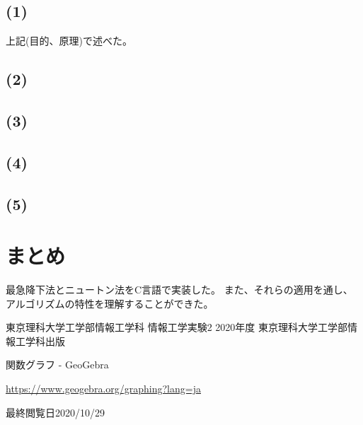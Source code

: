 \documentclass[12pt]{jarticle}
\begin{document}
\subsection*{(1)}
上記(目的、原理)で述べた。
\subsection*{(2)}

\subsection*{(3)}

\subsection*{(4)}

\subsection*{(5)}

\section{まとめ}
最急降下法とニュートン法をC言語で実装した。
また、それらの適用を通し、
アルゴリズムの特性を理解することができた。

\clearpage

\begin{thebibliography}{99}
    \label{sannkoubunnkenn_chapter}
    東京理科大学工学部情報工学科 情報工学実験2 2020年度
    東京理科大学工学部情報工学科出版

    関数グラフ - GeoGebra

    \url{https://www.geogebra.org/graphing?lang=ja}

    最終閲覧日2020/10/29

\end{thebibliography}


\clearpage

\appendix
\end{document}
